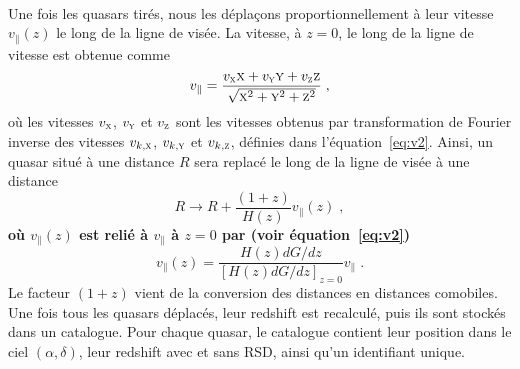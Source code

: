 \documentclass[11pt, twoside, a4paper, openright]{report}
\begin{document}
\paragraph{}
Une fois les quasars tirés, nous les déplaçons proportionnellement à leur vitesse $v_{\parallel}(z)$ le long de la ligne de visée.
La vitesse, à $z=0$, le long de la ligne de vitesse est obtenue comme
\begin{equation}
  \label{eq:vpar1}
  v_{\parallel} = \frac{v_{\textsc{x}} \textsc{x} + v_{\textsc{y}} \textsc{y} + v_{\textsc{z}} \textsc{z}}{\sqrt{\textsc{x}^2 + \textsc{y}^2 + \textsc{z}^2}} \; ,
\end{equation}
où les vitesses $v_{\textsc{x}}$, $v_{\textsc{y}}$ et $v_{\textsc{z}}$ sont les vitesses obtenus par transformation de Fourier inverse des vitesses $v_{k,\textsc{x}}$, $v_{k,\textsc{y}}$ et $v_{k,\textsc{z}}$, définies dans l'équation~\ref{eq:v2}.
Ainsi, un quasar situé à une distance $R$ sera replacé le long de la ligne de visée à une distance
\begin{equation}
 R \rightarrow  R + \frac{(1+z)}{H(z)} v_{\parallel}(z) \; ,  %
\end{equation}
\textbf{où $v_{\parallel}(z)$ est relié à $v_{\parallel}$ à $z = 0$ par (voir équation~\ref{eq:v2})}
\begin{equation}
  v_{\parallel}(z) = \frac{H(z) dG/dz}{[H(z) dG/dz]_{z=0}} v_{\parallel} \; .
\end{equation}
Le facteur $(1+z)$ vient de la conversion des distances en distances comobiles. Une fois tous les quasars déplacés, leur redshift est recalculé, puis ils sont stockés dans un catalogue. Pour chaque quasar, le catalogue contient leur position dans le ciel $(\alpha, \delta)$, leur redshift avec et sans RSD, ainsi qu'un identifiant unique.
\end{document}

